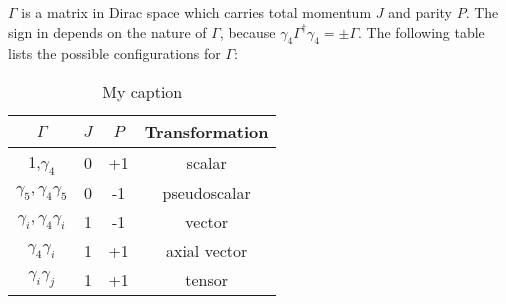     $\Gamma$ is a matrix in Dirac space which carries total momentum $J$ and parity $P$. The sign in  depends on the nature of $\Gamma$, because $\gamma_4\Gamma^\dagger\gamma_4 = \pm \Gamma$. The following table lists the possible configurations for $\Gamma$:
    \begin{table}[h]
        \centering
        \begin{tabular}{|c|c|c|c|}
        \hline
        \multicolumn{1}{|c|}{$\Gamma$} & \multicolumn{1}{c|}{$J$} & \multicolumn{1}{c|}{$P$} & \multicolumn{1}{c|}{Transformation} \\ \hline
         1,$\gamma_4$ & 0 & +1 &    scalar           \\
         $\gamma_5, \gamma_4\gamma_5$                      &  0                     &  -1                     &  pseudoscalar                     \\
         $\gamma_i,\gamma_4\gamma_i$                      & 1                      &    -1                   &  vector                     \\
         $\gamma_4\gamma_i$                      & 1                      &  +1                     & axial vector                      \\
          $\gamma_i\gamma_j$                     & 1                      & +1                      & tensor                     
        \end{tabular}
        \caption{My caption}
        \label{my-label}
    \end{table}